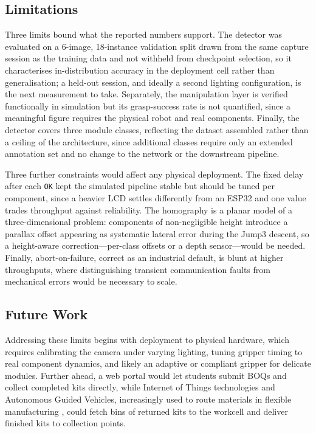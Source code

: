 \documentclass[conference]{IEEEtran}
\begin{document}
\subsection{Limitations}
\label{sec:limits}
Three limits bound what the reported numbers support. The detector was evaluated on a 6-image, 18-instance validation split drawn from the same capture session as the training data and not withheld from checkpoint selection, so it characterises in-distribution accuracy in the deployment cell rather than generalisation; a held-out session, and ideally a second lighting configuration, is the next measurement to take. Separately, the manipulation layer is verified functionally in simulation but its grasp-success rate is not quantified, since a meaningful figure requires the physical robot and real components. Finally, the detector covers three module classes, reflecting the dataset assembled rather than a ceiling of the architecture, since additional classes require only an extended annotation set and no change to the network or the downstream pipeline.

Three further constraints would affect any physical deployment. The fixed delay after each \texttt{OK} kept the simulated pipeline stable but should be tuned per component, since a heavier LCD settles differently from an ESP32 and one value trades throughput against reliability. The homography is a planar model of a three-dimensional problem: components of non-negligible height introduce a parallax offset appearing as systematic lateral error during the Jump3 descent, so a height-aware correction---per-class offsets or a depth sensor---would be needed. Finally, abort-on-failure, correct as an industrial default, is blunt at higher throughputs, where distinguishing transient communication faults from mechanical errors would be necessary to scale.
\subsection{Future Work}
Addressing these limits begins with deployment to physical hardware, which requires calibrating the camera under varying lighting, tuning gripper timing to real component dynamics, and likely an adaptive or compliant gripper for delicate modules. Further ahead, a web portal would let students submit BOQs and collect completed kits directly, while Internet of Things technologies and Autonomous Guided Vehicles, increasingly used to route materials in flexible manufacturing \cite{vlachos}, could fetch bins of returned kits to the workcell and deliver finished kits to collection points.
\end{document}
